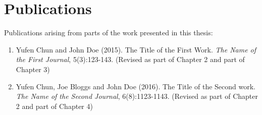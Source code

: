 

%
%

\chapter*{Publications}

Publications arising from parts of the work presented in this thesis:

\begin{enumerate}
\item Yufen Chun and John Doe (2015). The Title of the First Work. {\slshape The Name of the First Journal}, 5(3):123-143. (Revised as part of Chapter 2 and part of Chapter 3)
\item Yufen Chun, Joe Bloggs and John Doe (2016). The Title of the Second work.   {\slshape The Name of the Second Journal}, 6(8):1123-1143. (Revised as part of Chapter 2 and part of Chapter 4)
\end{enumerate}
